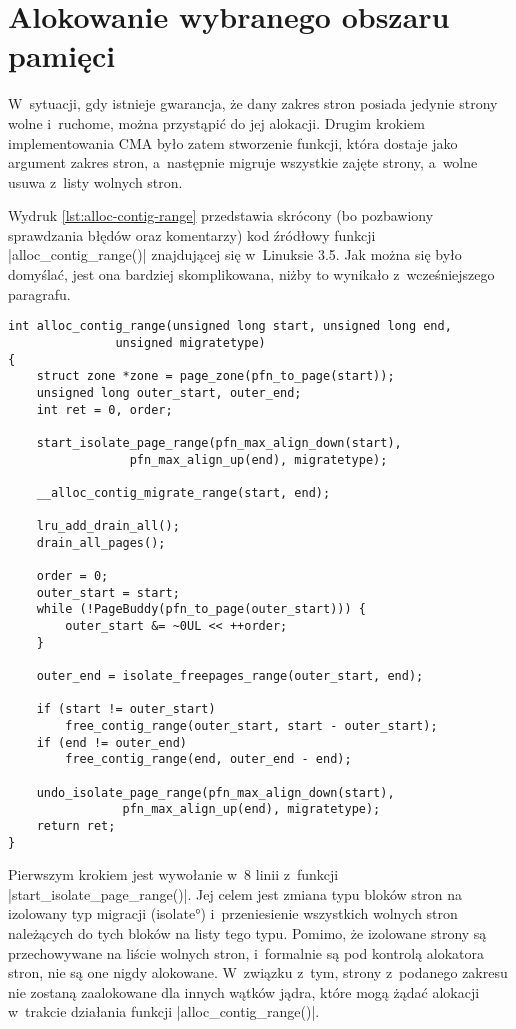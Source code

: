 \section{Alokowanie wybranego obszaru pamięci}\label{sec:alloc-contig-range}

W~sytuacji, gdy istnieje gwarancja, że dany zakres stron posiada
jedynie strony wolne i~ruchome, można przystąpić do jej alokacji.
Drugim krokiem implementowania CMA było zatem stworzenie funkcji,
która dostaje jako argument zakres stron, a~następnie migruje
wszystkie zajęte strony, a~wolne usuwa z~listy wolnych stron.

Wydruk \ref{lst:alloc-contig-range} przedstawia skrócony (bo
pozbawiony sprawdzania błędów oraz komentarzy) kod źródłowy funkcji
\code|alloc_contig_range()| znajdującej się w~Linuksie 3.5.  Jak
można się było domyślać, jest ona bardziej skomplikowana, niżby to
wynikało z~wcześniejszego paragrafu.

\begin{lstlisting}[float=tbhp,caption=Skrócony wydruk funkcji
    \code|alloc_conting_range()| z Linuksa 3.5.,label=lst:alloc-contig-range]
int alloc_contig_range(unsigned long start, unsigned long end,
		       unsigned migratetype)
{
	struct zone *zone = page_zone(pfn_to_page(start));
	unsigned long outer_start, outer_end;
	int ret = 0, order;

	start_isolate_page_range(pfn_max_align_down(start),
				 pfn_max_align_up(end), migratetype);

	__alloc_contig_migrate_range(start, end);

	lru_add_drain_all();
	drain_all_pages();

	order = 0;
	outer_start = start;
	while (!PageBuddy(pfn_to_page(outer_start))) {
		outer_start &= ~0UL << ++order;
	}

	outer_end = isolate_freepages_range(outer_start, end);

	if (start != outer_start)
		free_contig_range(outer_start, start - outer_start);
	if (end != outer_end)
		free_contig_range(end, outer_end - end);

	undo_isolate_page_range(pfn_max_align_down(start),
				pfn_max_align_up(end), migratetype);
	return ret;
}
\end{lstlisting}

Pierwszym krokiem jest wywołanie w~8 linii z~funkcji
\code|start_isolate_page_range()|.  Jej celem jest zmiana typu
bloków stron na izolowany typ migracji (\ang{isolate}) i~przeniesienie
wszystkich wolnych stron należących do tych bloków na listy tego typu.
Pomimo, że izolowane strony są przechowywane na liście wolnych stron,
i~formalnie są pod kontrolą alokatora stron, nie są one nigdy
alokowane.  W~związku z~tym, strony z~podanego zakresu nie zostaną
zaalokowane dla innych wątków jądra, które mogą żądać alokacji
w~trakcie działania funkcji \code|alloc_contig_range()|.

